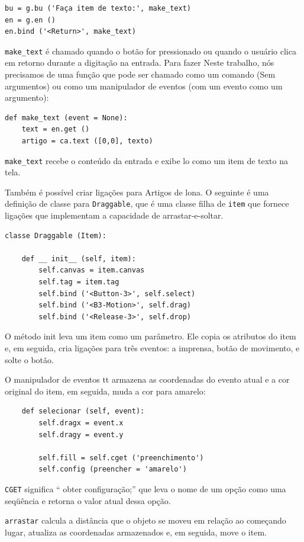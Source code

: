 \documentclass[10pt]{book}
\begin{document}
\begin{v erbatim}
\begin{verbatim}
bu = g.bu ('Faça item de texto:', make_text)
en = g.en ()
en.bind ('<Return>', make_text)
\end{verbatim}
%
\Verb "make_text" é chamado quando o botão for pressionado ou quando
o usuário clica em {\sf retorno} durante a digitação na entrada. Para fazer
Neste trabalho, nós precisamos de uma função que pode ser chamado como um comando
(Sem argumentos) ou como um manipulador de eventos (com um evento
como um argumento):

\begin{verbatim}
def make_text (event = None):
    text = en.get ()
    artigo = ca.text ([0,0], texto)
\end{verbatim}
%
\Verb "make_text" recebe o conteúdo da entrada e exibe
lo como um item de texto na tela.

Também é possível criar ligações para Artigos de lona.
O seguinte é uma definição de classe para {\tt Draggable},
que é uma classe filha de {\tt item} que fornece ligações
que implementam a capacidade de arrastar-e-soltar.

\begin{verbatim}
classe Draggable (Item):

    def __ init__ (self, item):
        self.canvas = item.canvas
        self.tag = item.tag
        self.bind ('<Button-3>', self.select)
        self.bind ('<B3-Motion>', self.drag)
        self.bind ('<Release-3>', self.drop)
\end{verbatim}
%
O método init leva um item como um parâmetro. Ele copia
os atributos do item e, em seguida, cria ligações para
três eventos: a imprensa, botão de movimento, e solte o botão.

O manipulador de eventos {\selecionar tt} armazena as coordenadas
do evento atual e a cor original do item, em seguida,
muda a cor para amarelo:

\begin{verbatim}
    def selecionar (self, event):
        self.dragx = event.x
        self.dragy = event.y

        self.fill = self.cget ('preenchimento')
        self.config (preencher = 'amarelo')
\end{verbatim}
%
{\tt CGET} significa `` obter configuração;'' que leva o nome de um
opção como uma seqüência e retorna o valor atual dessa opção.

{\tt arrastar} calcula a distância que o objeto se moveu em relação ao
começando lugar, atualiza as coordenadas armazenados e, em seguida, move o
item.


\end{v erbatim}
\end{document}
